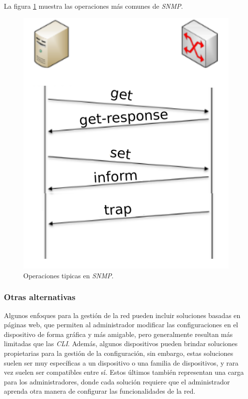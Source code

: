La figura \ref{fig:snmpfig} muestra las operaciones más comunes de \textit{SNMP}.

\begin{figure}[htbp]
	\centering
	\includegraphics[scale=0.8]{Figures/snmp_ejemplo.pdf}
	\caption{Operaciones tipicas en \textit{SNMP}.}
	\label{fig:snmpfig}
  \end{figure}

\subsubsection{Otras alternativas}
Algunos enfoques para la gestión de la red pueden incluir soluciones basadas en páginas web, que permiten al administrador modificar las configuraciones en el dispositivo de forma gráfica y más amigable, pero generalmente resultan más limitadas que las \textit{CLI}. 
Además, algunos dispositivos pueden brindar soluciones propietarias para la gestión de la configuración, sin embargo, estas soluciones suelen ser muy específicas a un dispositivo o una familia de dispositivos, y rara vez suelen ser compatibles entre sí. Estos últimos también representan una carga para los administradores, donde cada solución requiere que el administrador aprenda otra manera de configurar las funcionalidades de la red.  

